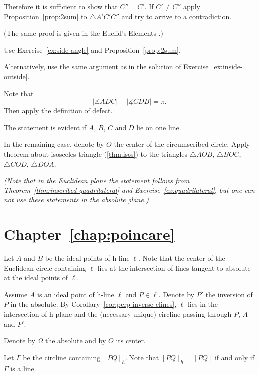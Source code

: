Therefore it is sufficient to show that $C''=C'$.
If $C'\ne C''$ apply Proposition~\ref{prop:2sum} to $\triangle A'C'C''$ and try to arrive to a contradiction.

(The same proof is given in  the Euclid's Elements \cite[Book I, Proposition 26]{euclid}.)

Use Exercise~\ref{ex:side-angle} and Proposition~\ref{prop:2sum}.

Alternatively, use the same argument as in the solution of Exercise~\ref{ex:inside-outside}.


Note that 
$$|\measuredangle ADC|+|\measuredangle CDB|=\pi.$$
Then apply the definition of defect.

The statement is evident if $A$, $B$, $C$ and $D$ lie on one line.

In the remaining case, 
denote by $O$ the center of the circumscribed circle.
Apply theorem about isosceles triangle (\ref{thm:isos}) to the triangles 
$\triangle AOB$,
$\triangle BOC$, 
$\triangle COD$, 
$\triangle DOA$. 

\textit{(Note that in the Euclidean plane the statement follows from Theorem~\ref{thm:inscribed-quadrilateral} and Exercise~\ref{ex:quadrilateral},
but one can not use these statements in the absolute plane.)}

\section*{Chapter~\ref{chap:poincare}}
\setcounter{eqtn}{0}

Let $A$ and $B$ be the ideal points of h-line $\ell$. 
Note that the center of the Euclidean circle containing $\ell$ lies 
at the intersection of lines tangent to absolute at the ideal points of $\ell$.

Assume $A$ is an ideal point of h-line $\ell$
and $P\in \ell$.
Denote by $P'$ the inversion of $P$ in the absolute.
By Corollary~\ref{cor:perp-inverse-clines},
$\ell$ lies in the intersection of h-plane and the (necessary unique) circline 
passing through $P$, $A$ and $P'$.

Denote by $\Omega$ the absolute and by $O$ its center. 

Let $\Gamma$ be the circline containing $[PQ]_h$.
Note that $[PQ]_h=[PQ]$ if and only if $\Gamma$ is a line.

